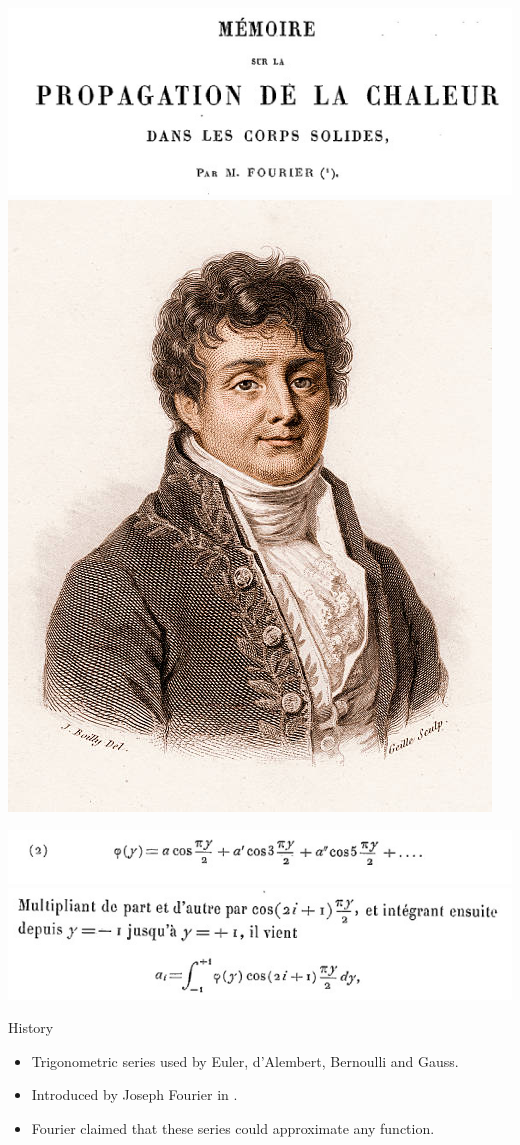 \begin{center}
    \includegraphics[width=.7\linewidth]{imgs/fourier/fourier_series_title}
    \includegraphics[width=.2\linewidth]{imgs/fourier/fourier}

    \includegraphics[width=.7\linewidth]{imgs/fourier/fourier_series1}
    \includegraphics[width=.7\linewidth]{imgs/fourier/fourier_series2}
  \end{center}
  \vspace{-5mm}
  \begin{block}{History}
    \begin{itemize}
      \item Trigonometric series used by Euler, d'Alembert, Bernoulli and Gauss.
      \item Introduced by Joseph Fourier in \cite{fourier1807memoire}.
      \item Fourier claimed that these series could approximate any function.
    \end{itemize}

  \end{block}


